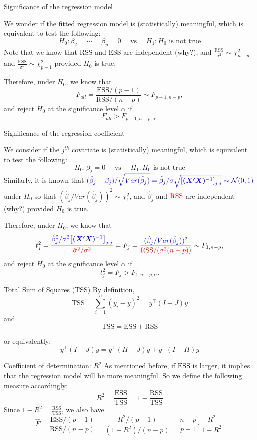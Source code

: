 \documentclass[ignorenonframetext,]{beamer}
\begin{document}
\begin{frame}{Significance of the regression model}

We wonder if the fitted regression model is (statistically) meaningful, which is equivalent to test the following:
$$
H_0: \beta_2=\cdots=\beta_p=0 \quad \text{ vs } \quad  H_1: H_0 \text{ is not true}
$$
Note that we know that $\mathrm{RSS}$ and $\mathrm{ESS}$ are independent (why?),  and $\frac{\mathrm{RSS}}{\sigma^2} \sim \chi^2_{n-p}$ and $\frac{\mathrm{ESS}}{\sigma^2} \sim \chi^2_{p-1}
$ {\color{red}provided $H_0$ is true}.

Therefore, under $H_0$, we know that
$$
{F}_{all}=\frac{\mathrm{ESS} / (p-1)}{\mathrm{RSS} / (n-p)} \sim F_{p-1, n-p},
$$
and reject $H_0$ at the significance level $\alpha$ if
$$
{F}_{all} > F_{p-1, n-p; \alpha}.
$$

\end{frame}


\begin{frame}{Significance of the regression coefficient}

We consider if the $j^{th}$ covariate is (statistically) meaningful, which is equivalent to test the following:
$$
H_0: \beta_j=0 \quad \text{ vs } \quad  H_1: H_0 \text{ is not true}
$$
Similarly, it is known that 
$ \color{blue}
(\hat{\beta}_j -\beta_j)/ \sqrt{Var(\hat{\beta}_j)}={\hat{\beta}_j}/{\sigma \sqrt{\left[\bm{(X'X)}^{-1}\right]_{j,j}}} \sim \mathcal{N}(0,1)$ under $H_0$ so that $(\hat{\beta}_j / Var(\hat{\beta}_j) )^2 \sim \chi^2_1$, 
 and $\hat{\beta}_j$ and $\color{red} \mathrm{RSS}$ are independent (why?) provided $H_0$ is true.

Therefore, under $H_0$, we know that
$$
t^2_j = \frac{\color{blue} {\hat{\beta}^2_j}/{\sigma^2 {\left[\bm{(X'X)}^{-1}\right]_{j,j}}}}{\color{red} \hat{\sigma}^2 /\sigma^2 }={F}_j=\frac{\color{blue}(\hat{\beta}_j / Var(\hat{\beta}_j) )^2}{\color{red}\mathrm{RSS} / (\sigma^2(n-p))}  \sim F_{1, n-p},
$$
and reject $H_0$ at the significance level $\alpha$ if
$$
t^2_j={F}_j > F_{1, n-p; \alpha}.
$$

\end{frame}

\begin{frame}{Total Sum of Squares (TSS)}
By definition, \[
\mathrm{TSS} = \sum_{i=1}^n (y_i - \bar{y})^2
= y^\top (I - J) y
\] and
\[
\boxed{
\mathrm{TSS} = \mathrm{ESS} + \mathrm{RSS}
}
\]



or equivalently:
\[
y^\top (I - J) y = y^\top (H - J) y + y^\top (I - H) y
\]

\end{frame}

\begin{frame}{Coefficient of determination: $R^2$}
As mentioned before, if $\mathrm{ESS}$ is larger, it implies that the regression model will be more meaningful. So we define the following measure accordingly:
$$
R^2 = \frac{\mathrm{ESS}}{\mathrm{TSS}} =1- \frac{\mathrm{RSS}}{\mathrm{TSS}}
$$
Since $1-R^2 = \frac{\mathrm{RSS}}{\mathrm{TSS}}$, we also have
$$
\hat{F}=\frac{\mathrm{ESS} / (p-1)}{\mathrm{RSS} / (n-p)} = \frac{R^2 / (p-1)}{(1-R^2) / (n-p)} = \frac{n-p}{p-1} \cdot \frac{R^2}{1-R^2}.
$$

\end{frame}
\end{document}
